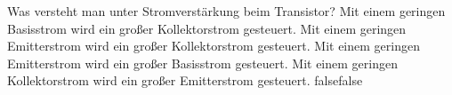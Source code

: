     {Was versteht man unter Stromverstärkung beim Transistor?}
    {Mit einem geringen Basisstrom wird ein großer Kollektorstrom gesteuert.}
    {Mit einem geringen Emitterstrom wird ein großer Kollektorstrom gesteuert.}
    {Mit einem geringen Emitterstrom wird ein großer Basisstrom gesteuert.}
    {Mit einem geringen Kollektorstrom wird ein großer Emitterstrom gesteuert.}
    {false}{false}